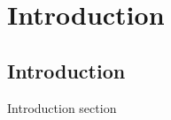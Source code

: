 \chapter[Introduction]{Introduction}

\label{Chap:Intro}

\section{Introduction}

Introduction section